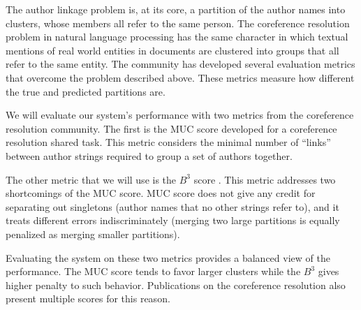 \documentclass[twocolumn,letterpaper]{article}
\begin{document}
The author linkage problem is, at its core, a partition of the author
names into clusters, whose members all refer to the same person.  The
coreference resolution problem in natural language processing has the
same character in which textual mentions of real world entities in
documents are clustered into groups that all refer to the same entity.
The community has developed several evaluation metrics that overcome
the problem described above.  These metrics measure how different the
true and predicted partitions are.

We will evaluate our system's performance with two metrics from the
coreference resolution community.  The first is the MUC score
\cite{Vilain95} developed for a coreference resolution shared task.
This metric considers the minimal number of ``links'' between author
strings required to group a set of authors together.

The other metric that we will use is the $B^3$ score \cite{Bagga98b}.
This metric addresses two shortcomings of the MUC score.  MUC score
does not give any credit for separating out singletons (author names
that no other strings refer to), and it treats different errors
indiscriminately (merging two large partitions is equally penalized as
merging smaller partitions).

Evaluating the system on these two metrics provides a balanced view of
the performance.  The MUC score tends to favor larger clusters while
the $B^3$ gives higher penalty to such behavior.  Publications on the
coreference resolution also present multiple scores for this reason.



\end{document}
